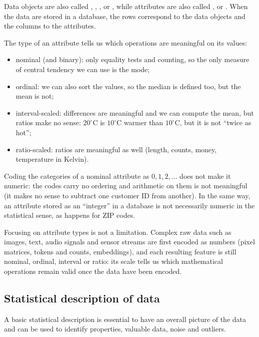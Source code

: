 Data objects are also called , , ,  or , while attributes are also called ,  or . When the data are stored in a database, the rows correspond to the data objects and the columns to the attributes.

The type of an attribute tells us which operations are meaningful on its values:
\begin{itemize}
    \item nominal (and binary): only equality tests and counting, so the only measure of central tendency we can use is the mode;
    \item ordinal: we can also sort the values, so the median is defined too, but the mean is not;
    \item interval-scaled: differences are meaningful and we can compute the mean, but ratios make no sense: $20^{\circ}$C is $10^{\circ}$C warmer than $10^{\circ}$C, but it is not ``twice as hot'';
    \item ratio-scaled: ratios are meaningful as well (length, counts, money, temperature in Kelvin).
\end{itemize}

\begin{remark}
Coding the categories of a nominal attribute as $0,1,2,\dots$ does not make it numeric: the codes carry no ordering and arithmetic on them is not meaningful (it makes no sense to subtract one customer ID from another). In the same way, an attribute stored as an ``integer'' in a database is not necessarily numeric in the statistical sense, as happens for ZIP codes.
\end{remark}

Focusing on attribute types is not a limitation. Complex raw data such as images, text, audio signals and sensor streams are first encoded as numbers (pixel matrices, tokens and counts, embeddings), and each resulting feature is still nominal, ordinal, interval or ratio: its scale tells us which mathematical operations remain valid once the data have been encoded.

\subsection{Statistical description of data}

A basic statistical description is essential to have an overall picture of the data and can be used to identify properties, valuable data, noise and outliers. 

